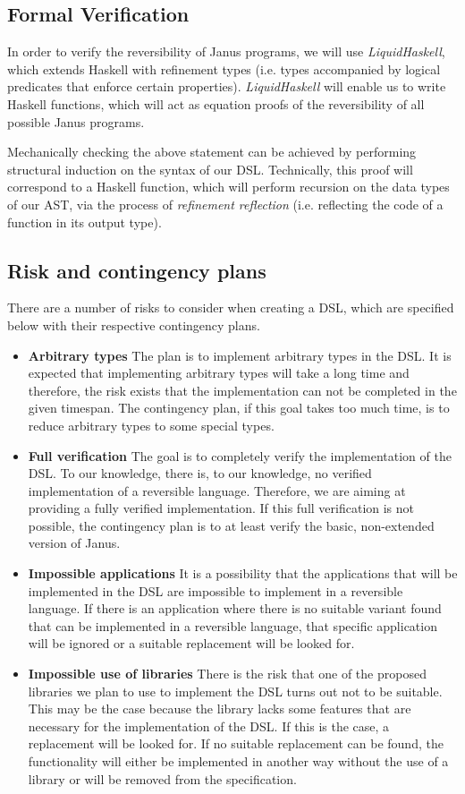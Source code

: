 \documentclass[12pt,a4paper]{article}
\begin{document}
\subsection{Formal Verification}
In order to verify the reversibility of Janus programs, we will use \textit{LiquidHaskell}, which extends Haskell with refinement types (i.e. types accompanied by logical predicates that enforce certain properties). \textit{LiquidHaskell} will enable us to write Haskell functions, which will act as equation proofs of the reversibility of all possible Janus programs.

Mechanically checking the above statement can be achieved by performing structural induction on the syntax of our DSL. Technically, this proof will correspond to a Haskell function, which will perform recursion on the data types of our AST, via the process of \textit{refinement reflection} (i.e. reflecting the code of a function in its output type).

\subsection{Risk and contingency plans}
There are a number of risks to consider when creating a DSL, which are specified below with their respective contingency plans.
\begin{itemize}
\item \textbf{Arbitrary types} The plan is to implement arbitrary types in the DSL. It is expected that implementing arbitrary types will take a long time and therefore, the risk exists that the implementation can not be completed in the given timespan. The contingency plan, if this goal takes too much time, is to reduce arbitrary types to some special types.
\item \textbf{Full verification} The goal is to completely verify the implementation of the DSL. To our knowledge, there is, to our knowledge, no verified implementation of a reversible language. Therefore, we are aiming at providing a fully verified implementation. If this full verification is not possible, the contingency plan is to at least verify the basic, non-extended version of Janus. 
\item \textbf{Impossible applications} It is a possibility that the applications that will be implemented in the DSL are impossible to implement in a reversible language. If there is an application where there is no suitable variant found that can be implemented in a reversible language, that specific application will be ignored or a suitable replacement will be looked for. 
\item \textbf{Impossible use of libraries} There is the risk that one of the proposed libraries we plan to use to implement the DSL turns out not to be suitable. This may be the case because the library lacks some features that are necessary for the implementation of the DSL. If this is the case, a replacement will be looked for. If no suitable replacement can be found, the functionality will either be implemented in another way without the use of a library or will be removed from the specification.
\end{itemize}
\end{document}
